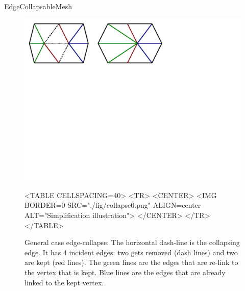 \begin{ccRefConcept}{EdgeCollapsableMesh}
\begin{figure}[htbp]
\begin{ccTexOnly}
\begin{center}
\includegraphics[width=17cm]{Surface_mesh_simplification_ref/fig/collapse0} %
\end{center}
\end{ccTexOnly}
\begin{ccHtmlOnly}
<TABLE CELLSPACING=40>
<TR>
<CENTER>
<IMG BORDER=0 SRC="./fig/collapse0.png" ALIGN=center ALT="Simplification illustration">
</CENTER>
</TR>
</TABLE>
\end{ccHtmlOnly}
\caption{General case edge-collapse: The horizontal dash-line is the collapsing edge. It has 4 incident edges: two gets removed (dash lines) and two are kept (red lines). The green lines are the edges that are re-link to the vertex that is kept. Blue lines are the edges that are already linked to the kept vertex.}
\end{figure}



\end{ccRefConcept}
